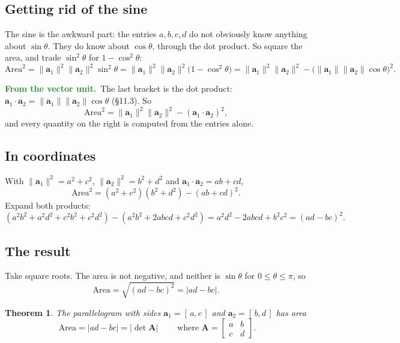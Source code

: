 \documentclass[11pt]{article}
\theoremstyle{plain}
\newtheorem{thm}{Theorem}[section]
\theoremstyle{definition}
\theoremstyle{remark}
\newcommand{\lookback}[1][the vector unit]{\par\smallskip\noindent
  \textbf{\sffamily\textcolor{ForestGreen}{From #1.}}\ \ignorespaces}
\newcommand{\vc}[1]{\mathbf{#1}}
\newcommand{\mt}[1]{\mathbf{#1}}
\newcommand{\norm}[1]{\lVert #1\rVert}
\begin{document}
\subsection{Getting rid of the sine}
The sine is the awkward part: the entries $a,b,c,d$ do not obviously know
anything about $\sin\theta$. They do know about $\cos\theta$, through the dot
product. So square the area, and trade $\sin^{2}\theta$ for
$1-\cos^{2}\theta$:
\[
  \text{Area}^{2}
  =\norm{\vc{a}_1}^{2}\norm{\vc{a}_2}^{2}\sin^{2}\theta
  =\norm{\vc{a}_1}^{2}\norm{\vc{a}_2}^{2}\bigl(1-\cos^{2}\theta\bigr)
  =\norm{\vc{a}_1}^{2}\norm{\vc{a}_2}^{2}
   -\bigl(\norm{\vc{a}_1}\norm{\vc{a}_2}\cos\theta\bigr)^{2} .
\]
\lookback The last bracket is the dot product:
$\vc{a}_1\cdot\vc{a}_2=\norm{\vc{a}_1}\norm{\vc{a}_2}\cos\theta$ (\S11.3). So
\[
  \text{Area}^{2}=\norm{\vc{a}_1}^{2}\norm{\vc{a}_2}^{2}-(\vc{a}_1\cdot\vc{a}_2)^{2},
\]
and every quantity on the right is computed from the entries alone.

\subsection{In coordinates}
With $\norm{\vc{a}_1}^{2}=a^{2}+c^{2}$, $\norm{\vc{a}_2}^{2}=b^{2}+d^{2}$ and
$\vc{a}_1\cdot\vc{a}_2=ab+cd$,
\[
  \text{Area}^{2}=(a^{2}+c^{2})(b^{2}+d^{2})-(ab+cd)^{2} .
\]
Expand both products:
\[
  (a^{2}b^{2}+a^{2}d^{2}+c^{2}b^{2}+c^{2}d^{2})
  -(a^{2}b^{2}+2abcd+c^{2}d^{2})
  =a^{2}d^{2}-2abcd+b^{2}c^{2}
  =(ad-bc)^{2} .
\]

\subsection{The result}
Take square roots. The area is not negative, and neither is $\sin\theta$ for
$0\le\theta\le\pi$, so
\[
  \text{Area}=\sqrt{(ad-bc)^{2}}=|ad-bc| .
\]

\begin{thm}
\label{thm:area}
The parallelogram with sides $\vc{a}_1=[\,a,c\,]$ and $\vc{a}_2=[\,b,d\,]$ has
area
\[
  \boxed{\;\text{Area}=|ad-bc|=|\det\mt{A}|\;}
  \qquad\text{where }\mt{A}=\begin{bmatrix}a&b\\c&d\end{bmatrix}.
\]
\end{thm}
\end{document}

